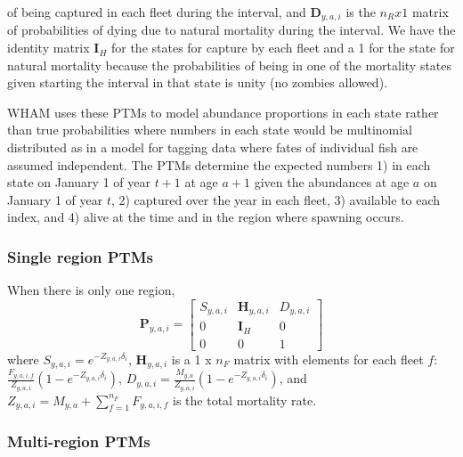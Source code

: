 \documentclass[
]{article}
\begin{document}
of being captured in each fleet during the interval, and
\(\mathbf{D}_{y,a,i}\) is the \(n_R x 1\) matrix of probabilities of
dying due to natural mortality during the interval. We have the identity
matrix \(\mathbf{I}_{H}\) for the states for capture by each fleet and a
1 for the state for natural mortality because the probabilities of being
in one of the mortality states given starting the interval in that state
is unity (no zombies allowed).

WHAM uses these PTMs to model abundance proportions in each state rather
than true probabilities where numbers in each state would be multinomial
distributed as in a model for tagging data where fates of individual
fish are assumed independent. The PTMs determine the expected numbers 1)
in each state on January 1 of year \(t+1\) at age \(a+1\) given the
abundances at age \(a\) on January 1 of year \(t\), 2) captured over the
year in each fleet, 3) available to each index, and 4) alive at the time
and in the region where spawning occurs.

\hypertarget{single-region-ptms}{%
\subsubsection*{Single region PTMs}\label{single-region-ptms}}

When there is only one region, \begin{equation}\label{eq:ptm_1_region}
\mathbf{P}_{y,a,i} = 
  \begin{bmatrix}
     S_{y,a,i} & \mathbf{H}_{y,a,i} & D_{y,a,i} \\
     0 & \mathbf{I}_{H} & 0\\
     0 & 0 & 1
  \end{bmatrix}
\end{equation} where \(S_{y,a,i} = e^{-Z_{y,a,i}\delta_i}\),
\(\mathbf{H}_{y,a,i}\) is a 1 x \(n_F\) matrix with elements for each
fleet \(f\):
\(\frac{F_{y,a,i,f}}{Z_{y,a,i}}\left(1 - e^{-Z_{y,a,i}\delta_i}\right)\),
\(D_{y,a,i} = \frac{M_{y,a}}{Z_{y,a,i}}\left(1 - e^{-Z_{y,a,i}\delta_i}\right)\),
and \(Z_{y,a,i} = M_{y,a} + \sum^{n_F}_{f=1} F_{y,a,i,f}\) is the total
mortality rate.

\hypertarget{multi-region-ptms}{%
\subsubsection*{Multi-region PTMs}\label{multi-region-ptms}}
\end{document}
